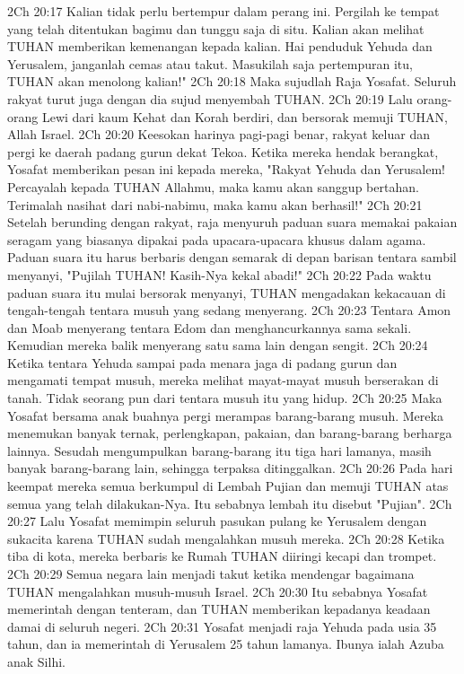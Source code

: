 2Ch 20:17  Kalian tidak perlu bertempur dalam perang ini. Pergilah ke tempat yang telah ditentukan bagimu dan tunggu saja di situ. Kalian akan melihat TUHAN memberikan kemenangan kepada kalian. Hai penduduk Yehuda dan Yerusalem, janganlah cemas atau takut. Masukilah saja pertempuran itu, TUHAN akan menolong kalian!"
2Ch 20:18  Maka sujudlah Raja Yosafat. Seluruh rakyat turut juga dengan dia sujud menyembah TUHAN.
2Ch 20:19  Lalu orang-orang Lewi dari kaum Kehat dan Korah berdiri, dan bersorak memuji TUHAN, Allah Israel.
2Ch 20:20  Keesokan harinya pagi-pagi benar, rakyat keluar dan pergi ke daerah padang gurun dekat Tekoa. Ketika mereka hendak berangkat, Yosafat memberikan pesan ini kepada mereka, "Rakyat Yehuda dan Yerusalem! Percayalah kepada TUHAN Allahmu, maka kamu akan sanggup bertahan. Terimalah nasihat dari nabi-nabimu, maka kamu akan berhasil!"
2Ch 20:21  Setelah berunding dengan rakyat, raja menyuruh paduan suara memakai pakaian seragam yang biasanya dipakai pada upacara-upacara khusus dalam agama. Paduan suara itu harus berbaris dengan semarak di depan barisan tentara sambil menyanyi, "Pujilah TUHAN! Kasih-Nya kekal abadi!"
2Ch 20:22  Pada waktu paduan suara itu mulai bersorak menyanyi, TUHAN mengadakan kekacauan di tengah-tengah tentara musuh yang sedang menyerang.
2Ch 20:23  Tentara Amon dan Moab menyerang tentara Edom dan menghancurkannya sama sekali. Kemudian mereka balik menyerang satu sama lain dengan sengit.
2Ch 20:24  Ketika tentara Yehuda sampai pada menara jaga di padang gurun dan mengamati tempat musuh, mereka melihat mayat-mayat musuh berserakan di tanah. Tidak seorang pun dari tentara musuh itu yang hidup.
2Ch 20:25  Maka Yosafat bersama anak buahnya pergi merampas barang-barang musuh. Mereka menemukan banyak ternak, perlengkapan, pakaian, dan barang-barang berharga lainnya. Sesudah mengumpulkan barang-barang itu tiga hari lamanya, masih banyak barang-barang lain, sehingga terpaksa ditinggalkan.
2Ch 20:26  Pada hari keempat mereka semua berkumpul di Lembah Pujian dan memuji TUHAN atas semua yang telah dilakukan-Nya. Itu sebabnya lembah itu disebut "Pujian".
2Ch 20:27  Lalu Yosafat memimpin seluruh pasukan pulang ke Yerusalem dengan sukacita karena TUHAN sudah mengalahkan musuh mereka.
2Ch 20:28  Ketika tiba di kota, mereka berbaris ke Rumah TUHAN diiringi kecapi dan trompet.
2Ch 20:29  Semua negara lain menjadi takut ketika mendengar bagaimana TUHAN mengalahkan musuh-musuh Israel.
2Ch 20:30  Itu sebabnya Yosafat memerintah dengan tenteram, dan TUHAN memberikan kepadanya keadaan damai di seluruh negeri.
2Ch 20:31  Yosafat menjadi raja Yehuda pada usia 35 tahun, dan ia memerintah di Yerusalem 25 tahun lamanya. Ibunya ialah Azuba anak Silhi.
